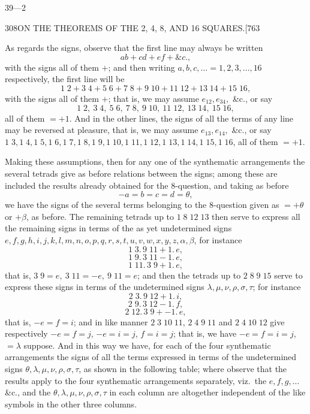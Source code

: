 \documentclass[11pt]{article}
\begin{document}
\begin{center}{\small 39---2}\end{center}

\begin{center}
{\small 308\hfill ON THE THEOREMS OF THE 2, 4, 8, AND 16 SQUARES.\hfill [763}
\end{center}

As regards the signs, observe that the first line may always be written
\[
ab + cd + ef + \&c.,
\]
with the signs all of them $+$; and then writing $a, b, c, \ldots = 1, 2, 3, \ldots, 16$ respectively,
the first line will be
\[
1\;2 + 3\;4 + 5\;6 + 7\;8 + 9\;10 + 11\;12 + 13\;14 + 15\;16,
\]
with the signs all of them $+$; that is, we may assume $e_{12}, e_{34},$ \&c., or say
\[
1\;2,\ 3\;4,\ 5\;6,\ 7\;8,\ 9\;10,\ 11\;12,\ 13\;14,\ 15\;16,
\]
all of them $=+1$. And in the other lines, the signs of all the terms of any line
may be reversed at pleasure, that is, we may assume $e_{13}, e_{14},$ \&c., or say $1\;3, 1\;4,
1\;5, 1\;6, 1\;7, 1\;8, 1\;9, 1\;10, 1\;11, 1\;12, 1\;13, 1\;14, 1\;15, 1\;16$, all of them
$=+1$.

Making these assumptions, then for any one of the synthematic arrangements the
several tetrads give as before relations between the signs; among these are included
the results already obtained for the 8-question, and taking as before
\[
-a = b = c = d = \theta,
\]
we have the signs of the several terms belonging to the 8-question given as $= +\theta$
or $+\beta$, as before. The remaining tetrads up to $1\;8\;12\;13$ then serve to express all
the remaining signs in terms of the as yet undetermined signs $e, f, g, h, i, j, k, l,
m, n, o, p, q, r, s, t, u, v, w, x, y, z, \alpha, \beta$, for instance
\[
1\;3.\,9\;11 + 1.\,e,
\]
\[
1\;9.\,3\;11 - 1.\,e,
\]
\[
1\;11.\,3\;9 + 1.\,e,
\]
that is, $3\;9 = e,\ 3\;11 = -e,\ 9\;11 = e$; and then the tetrads up to $2\;8\;9\;15$ serve to
express these signs in terms of the undetermined signs $\lambda, \mu, \nu, \rho, \sigma, \tau$; for instance
\[
2\;3.\,9\;12 + 1.\,i,
\]
\[
2\;9.\,3\;12 - 1.\,f,
\]
\[
2\;12.\,3\;9 + -1.\,e,
\]
that is, $-e = f = i$; and in like manner $2\;3\;10\;11$, $2\;4\;9\;11$ and $2\;4\;10\;12$ give
respectively $-e = f = j$, $-e = i = j$, $f = i = j$; that is, we have $-e = f = i = j$, $= \lambda$ suppose.
And in this way we have, for each of the four synthematic arrangements the signs
of all the terms expressed in terms of the undetermined signs $\theta, \lambda, \mu, \nu, \rho, \sigma, \tau$,
as shown in the following table; where observe that the results apply to the four
synthematic arrangements separately, viz.\ the $e, f, g, \ldots$ \&c., and the $\theta, \lambda, \mu, \nu, \rho, \sigma, \tau$
in each column are altogether independent of the like symbols in the other three
columns.
\end{document}
